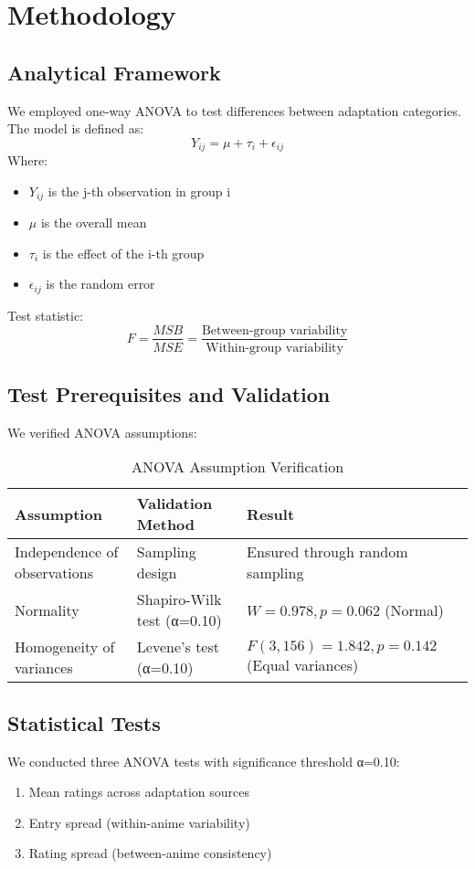 \documentclass{article}
\begin{document}
\section{Methodology}

\subsection{Analytical Framework}
We employed one-way ANOVA to test differences between adaptation categories. The model is defined as:
\[
Y_{ij} = \mu + \tau_i + \epsilon_{ij}
\]
Where:
\begin{itemize}
    \item $Y_{ij}$ is the j-th observation in group i
    \item $\mu$ is the overall mean
    \item $\tau_i$ is the effect of the i-th group
    \item $\epsilon_{ij}$ is the random error
\end{itemize}

Test statistic:
\[
F = \frac{MSB}{MSE} = \frac{\text{Between-group variability}}{\text{Within-group variability}}
\]

\subsection{Test Prerequisites and Validation}
We verified ANOVA assumptions:

\begin{table}[H]
\centering
\caption{ANOVA Assumption Verification}
\begin{tabular}{p{5cm}p{5cm}p{5cm}}
\toprule
\textbf{Assumption} & \textbf{Validation Method} & \textbf{Result} \\
\midrule
Independence of observations & Sampling design & Ensured through random sampling \\
Normality & Shapiro-Wilk test (α=0.10) & $W=0.978, p=0.062$ (Normal) \\
Homogeneity of variances & Levene's test (α=0.10) & $F(3,156)=1.842, p=0.142$ (Equal variances) \\
\bottomrule
\end{tabular}
\end{table}

\subsection{Statistical Tests}
We conducted three ANOVA tests with significance threshold α=0.10:
\begin{enumerate}
    \item Mean ratings across adaptation sources
    \item Entry spread (within-anime variability)
    \item Rating spread (between-anime consistency)
\end{enumerate}
\end{document}

